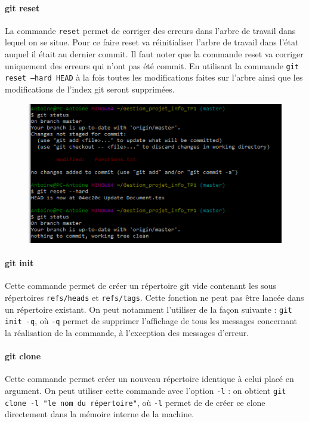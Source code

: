 \documentclass[11pt,canadien]{article}
\begin{document}
\paragraph{git reset}La commande \texttt{reset} permet de corriger des erreurs dans l'arbre de travail dans lequel on se situe. Pour ce faire reset va réinitialiser l'arbre de travail dans l'état auquel il était au dernier commit. Il faut noter que la commande reset va corriger uniquement des erreurs qui n'ont pas été commit. En utilisant la commande \texttt{git reset --hard HEAD} à la fois toutes les modifications faites sur l'arbre ainsi que les modifications de l'index git seront supprimées.
\begin{figure}[H]
	\centering
	\includegraphics{images/git_reset.png}
\end{figure}

\paragraph{git init}Cette commande permet de créer un répertoire git vide contenant les sous répertoires \texttt{refs/heads} et \texttt{refs/tags}. Cette fonction ne peut pas être lancée dans un répertoire existant. On peut notamment l’utiliser de la façon suivante : \texttt{git init -q}, où \texttt{-q} permet de supprimer l’affichage de tous les messages concernant la réalisation de la commande, à l’exception des messages d’erreur.

\paragraph{git clone}Cette commande permet créer un nouveau répertoire identique à celui placé en argument. On peut utiliser cette commande avec l’option \texttt{-l} : on obtient \texttt{git clone -l "le nom du répertoire"}, où \texttt{-l} permet de de créer ce clone directement dans la mémoire interne de la machine.
\end{document}

